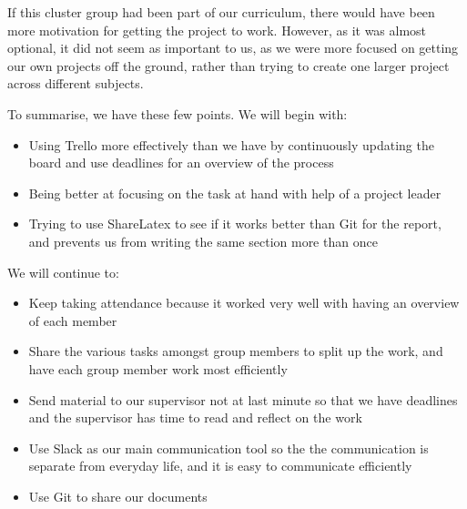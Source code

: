 If this cluster group had been part of our curriculum, there would have been more motivation for getting the project to work.
However, as it was almost optional, it did not seem as important to us, as we were more focused on getting our own projects off the ground, rather than trying to create one larger project across different subjects.
\vspace{12pt}

\noindent To summarise, we have these few points.
We will begin with:
\begin{itemize}
\item Using Trello more effectively than we have by continuously updating the board and use deadlines for an overview of the process
\item Being better at focusing on the task at hand with help of a project leader
\item Trying to use ShareLatex to see if it works better than Git for the report, and prevents us from writing the same section more than once
\end{itemize}

\noindent We will continue to:
\begin{itemize}
\item Keep taking attendance because it worked very well with having an overview of each member
\item Share the various tasks amongst group members to split up the work, and have each group member work most efficiently
\item Send material to our supervisor not at last minute so that we have deadlines and the supervisor has time to read and reflect on the work
\item Use Slack as our main communication tool so the the communication is separate from everyday life, and it is easy to communicate efficiently
\item Use Git to share our documents
\end{itemize}

